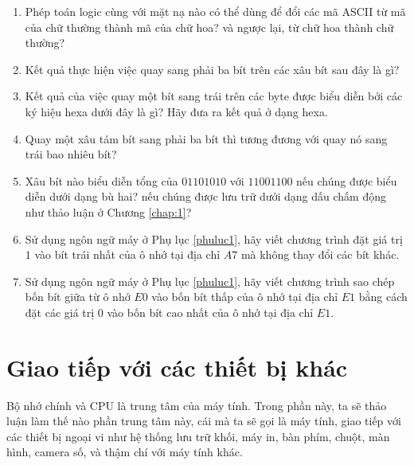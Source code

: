 \begin{enumerate}
\item Phép toán logic cùng với mặt nạ nào có thể dùng để đổi các mã ASCII từ mã của chữ
  thường thành mã của chữ hoa? và ngược lại, từ chữ hoa thành chữ thường?

\item Kết quả thực hiện việc quay sang phải ba bít trên các xâu bít sau đây là gì?


\item Kết quả của việc quay một bít sang trái trên các byte được biểu diễn bởi các ký hiệu
  hexa dưới đây là gì? Hãy đưa ra kết quả ở dạng hexa.



\item Quay một xâu tám bít sang phải ba bít thì tương đương với quay nó sang trái bao
  nhiêu bít?

\item Xâu bít nào biểu diễn tổng của $01101010$ với $11001100$ nếu chúng được biểu diễn
  dưới dạng bù hai? nếu chúng được lưu trữ dưới dạng dấu chấm động như thảo luận ở Chương
  \ref{chap:1}?

\item Sử dụng ngôn ngữ máy ở Phụ lục \ref{phuluc1}, hãy viết chương trình đặt giá trị $1$
  vào bít trái nhất của ô nhớ tại địa chỉ $A7$ mà không thay đổi các bít khác.

\item Sử dụng ngôn ngữ máy ở Phụ lục \ref{phuluc1}, hãy viết chương trình sao chép bốn bít
  giữa từ ô nhớ $E0$ vào bốn bít thấp của ô nhớ tại địa chỉ $E1$ bằng cách đặt các giá trị
  $0$ vào bốn bít cao nhất của ô nhớ tại địa chỉ $E1$.

\end{enumerate}

\section{Giao tiếp với các thiết bị khác}
\label{sec:2.5}
Bộ nhớ chính và CPU là trung tâm của máy tính. Trong phần này, ta sẽ thảo luận làm thế nào
phần trung tâm này, cái mà ta sẽ gọi là máy tính, giao tiếp với các thiết bị ngoại vi như
hệ thống lưu trữ khối, máy in, bàn phím, chuột, màn hình, camera số, và thậm chí với máy
tính khác.

